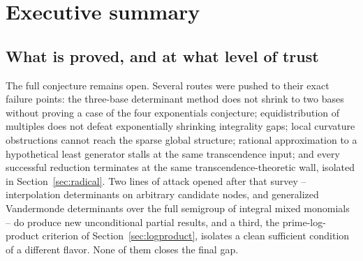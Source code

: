 \documentclass[11pt,oneside]{article}
\theoremstyle{definition}
\theoremstyle{remark}
\newcommand{\Z}{\mathbb Z}
\newcommand{\Torus}{\mathbb T}
\newcommand{\thetaq}{\vartheta}
\begin{document}
\begin{abstract}
A fourth continuation proves a joint triangle--Haar limit law for all conditional
solutions, effective discrepancy from Baker--Matveev, equidistribution in
$\widehat\Z^2\times\Torus$, fixed-congruence and compact-unit independence, and an
exact renormalized adelic joining after the uncentered $2$- and $3$-adic masses escape.
It also identifies the denominator jump process as a rigid Sturmian coboundary, proves
logarithmic Haar measure for the full curve $u\mapsto(\{u\},\{u^{\thetaq}\})$, gives
Borel--Cantelli and Hausdorff-dimension bounds in the exponent parameter, and derives a
near-Sidon law from finite-rank unit equations.  The synthesis is negative but precise:
fixed-scale measure theory cannot see the conjectural exact hits; a successful proof must
retain phase at an exponentially growing denominator or Fourier scale, or cross the
factor-four support threshold in the Matrix Coefficient program.
\end{abstract}

\tableofcontents
\clearpage
{}
\section{Executive summary}
\label{sec:executive}

\subsection{What is proved, and at what level of trust}
\label{ex:trust}

The full conjecture remains open.  Several routes were pushed to their exact failure points:
the three-base determinant method does not shrink to two bases without proving a case of the
four exponentials conjecture; equidistribution of multiples does not defeat exponentially
shrinking integrality gaps; local curvature obstructions cannot reach the sparse global
structure; rational approximation to a hypothetical least generator stalls at the same
transcendence input; and every successful reduction terminates at the same
transcendence-theoretic wall, isolated in Section~\ref{sec:radical}.  Two lines of attack
opened after that survey -- interpolation determinants on arbitrary candidate nodes, and
generalized Vandermonde determinants over the full semigroup of integral mixed monomials --
do produce new unconditional partial results, and a third, the prime-log-product criterion of
Section~\ref{sec:logproduct}, isolates a clean sufficient condition of a different flavor.
None of them closes the final gap.
\end{document}
